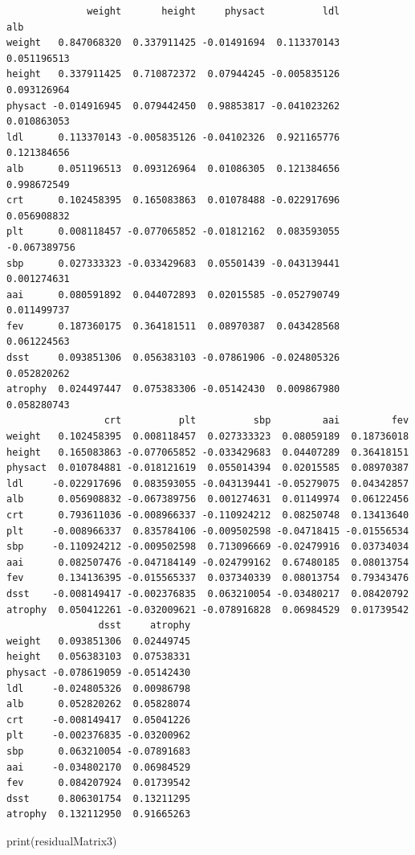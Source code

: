 \documentclass[
  letterpaper,
  DIV=11,
  numbers=noendperiod]{scrartcl}
\newenvironment{Shaded}{}{}
\newcommand{\FunctionTok}[1]{\textcolor[rgb]{0.41,0.62,0.42}{#1}}
\newcommand{\NormalTok}[1]{\textcolor[rgb]{0.24,0.22,0.21}{#1}}
\begin{document}
\begin{verbatim}
              weight       height     physact          ldl          alb
weight   0.847068320  0.337911425 -0.01491694  0.113370143  0.051196513
height   0.337911425  0.710872372  0.07944245 -0.005835126  0.093126964
physact -0.014916945  0.079442450  0.98853817 -0.041023262  0.010863053
ldl      0.113370143 -0.005835126 -0.04102326  0.921165776  0.121384656
alb      0.051196513  0.093126964  0.01086305  0.121384656  0.998672549
crt      0.102458395  0.165083863  0.01078488 -0.022917696  0.056908832
plt      0.008118457 -0.077065852 -0.01812162  0.083593055 -0.067389756
sbp      0.027333323 -0.033429683  0.05501439 -0.043139441  0.001274631
aai      0.080591892  0.044072893  0.02015585 -0.052790749  0.011499737
fev      0.187360175  0.364181511  0.08970387  0.043428568  0.061224563
dsst     0.093851306  0.056383103 -0.07861906 -0.024805326  0.052820262
atrophy  0.024497447  0.075383306 -0.05142430  0.009867980  0.058280743
                 crt          plt          sbp         aai         fev
weight   0.102458395  0.008118457  0.027333323  0.08059189  0.18736018
height   0.165083863 -0.077065852 -0.033429683  0.04407289  0.36418151
physact  0.010784881 -0.018121619  0.055014394  0.02015585  0.08970387
ldl     -0.022917696  0.083593055 -0.043139441 -0.05279075  0.04342857
alb      0.056908832 -0.067389756  0.001274631  0.01149974  0.06122456
crt      0.793611036 -0.008966337 -0.110924212  0.08250748  0.13413640
plt     -0.008966337  0.835784106 -0.009502598 -0.04718415 -0.01556534
sbp     -0.110924212 -0.009502598  0.713096669 -0.02479916  0.03734034
aai      0.082507476 -0.047184149 -0.024799162  0.67480185  0.08013754
fev      0.134136395 -0.015565337  0.037340339  0.08013754  0.79343476
dsst    -0.008149417 -0.002376835  0.063210054 -0.03480217  0.08420792
atrophy  0.050412261 -0.032009621 -0.078916828  0.06984529  0.01739542
                dsst     atrophy
weight   0.093851306  0.02449745
height   0.056383103  0.07538331
physact -0.078619059 -0.05142430
ldl     -0.024805326  0.00986798
alb      0.052820262  0.05828074
crt     -0.008149417  0.05041226
plt     -0.002376835 -0.03200962
sbp      0.063210054 -0.07891683
aai     -0.034802170  0.06984529
fev      0.084207924  0.01739542
dsst     0.806301754  0.13211295
atrophy  0.132112950  0.91665263
\end{verbatim}

\begin{Shaded}
\begin{Highlighting}[]
\FunctionTok{print}\NormalTok{(residualMatrix3)}
\end{Highlighting}
\end{Shaded}
\end{document}
